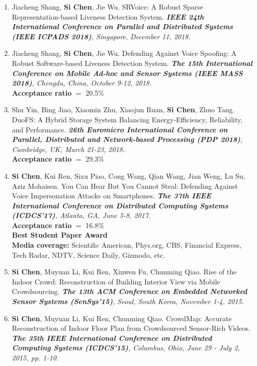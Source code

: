 \documentclass[letter]{article}
\newcommand{\publication}[4]{\item #1. #2. \emph{#3.} #4}
\begin{document}
\begin{description}
\begin{enumerate}[{C-}1.]
\publication{Jiacheng Shang, \textbf{Si Chen}, Jie Wu} {SRVoice: A Robust Sparse Representation-based Liveness Detection System}  {\textbf{IEEE 24th International Conference on Parallel and Distributed Systems (IEEE ICPADS 2018)}, Singapore, December 11, 2018} \\

\publication{Jiacheng Shang, \textbf{Si Chen}, Jie Wu} {Defending Against Voice Spoofing: A Robust Software-based Liveness Detection System}  {\textbf{The 15th International Conference on Mobile Ad-hoc and Sensor Systems (IEEE MASS 2018)}, Chengdu, China, October 9-12, 2018} \\
\textbf{Acceptance ratio} $=$ 20.5\% \\

\publication{Shu Yin, Bing Jiao, Xiaomin Zhu, Xiaojun Ruan, \textbf{Si Chen}, Zhuo Tang} {DuoFS: A Hybrid Storage System Balancing Energy-Efficiency, Reliability, and Performance}  {\textbf{26th Euromicro International Conference on Parallel, Distributed and Network-based Processing (PDP 2018)}, Cambridge, UK, March 21-23, 2018} \\
\textbf{Acceptance ratio} $=$ 29.3\% \\

\publication{\textbf{Si Chen}, Kui Ren, Sixu Piao, Cong Wang, Qian Wang, Jian Weng, Lu Su, Aziz Mohaisen} {You Can Hear But You Cannot Steal: Defending Against Voice Impersonation Attacks on Smartphones}  {\textbf{The 37th IEEE International Conference on Distributed Computing Systems (ICDCS'17)}, Atlanta, GA, June 5-8, 2017} \\
\textbf{Acceptance ratio} $=$ 16.8\% \\
\textbf{Best Student Paper Award} \\
\textbf{Media coverage: }Scientific American, Phys.org, CBS, Financial Express, Tech Radar, NDTV, Science Daily, Gizmodo, etc.\\

\publication{\textbf{Si Chen}, Muyuan Li, Kui Ren, Xinwen Fu, Chunming Qiao} {Rise of the Indoor Crowd: Reconstruction of Building Interior View via Mobile Crowdsourcing}  {\textbf{The 13th ACM Conference on Embedded Networked Sensor Systems (SenSys'15)}, Seoul, South Korea, November 1-4, 2015} \\

\publication{\textbf{Si Chen}, Muyuan Li, Kui Ren, Chunming Qiao} {CrowdMap: Accurate Reconstruction of Indoor Floor Plan from Crowdsourced Sensor-Rich Videos}  {\textbf{The 35th IEEE International Conference on Distributed Computing Systems (ICDCS'15)}, Columbus, Ohio, June 29 - July 2, 2015, pp. 1-10} \\


\end{enumerate}
\end{description}
\end{document}
